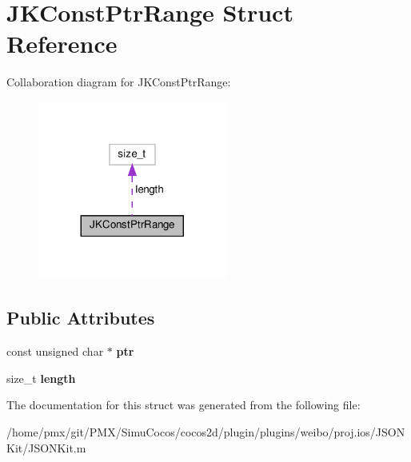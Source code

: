 \hypertarget{structJKConstPtrRange}{}\section{J\+K\+Const\+Ptr\+Range Struct Reference}
\label{structJKConstPtrRange}


Collaboration diagram for J\+K\+Const\+Ptr\+Range\+:
\nopagebreak
\begin{figure}[H]
\begin{center}
\leavevmode
\includegraphics[width=176pt]{structJKConstPtrRange__coll__graph}
\end{center}
\end{figure}
\subsection*{Public Attributes}
\begin{DoxyCompactItemize}
\item 
\mbox{\label{structJKConstPtrRange_afa2519e22b4232f1e2e01f23b5c3df4f}} 
const unsigned char $\ast$ {\bfseries ptr}
\item 
\mbox{\label{structJKConstPtrRange_a71e6d672adc0a4ab55448c2bb585d582}} 
size\+\_\+t {\bfseries length}
\end{DoxyCompactItemize}


The documentation for this struct was generated from the following file\+:\begin{DoxyCompactItemize}
\item 
/home/pmx/git/\+P\+M\+X/\+Simu\+Cocos/cocos2d/plugin/plugins/weibo/proj.\+ios/\+J\+S\+O\+N\+Kit/J\+S\+O\+N\+Kit.\+m\end{DoxyCompactItemize}
